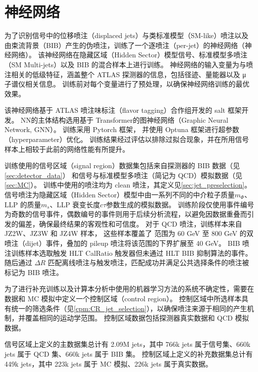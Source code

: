 
\chapter{神经网络}
\label{chap:NN}

为了识别信号中的位移喷注（displaced jets）与类标准模型（SM-like）喷注以及由束流背景（BIB）产生的伪喷注，训练了一个逐喷注（per-jet）的神经网络（神经网络）。
该神经网络在隐藏区域（Hidden Sector）模型信号、标准模型多喷注（SM Multi-jets）以及 BIB 的混合样本上进行训练。
神经网络的输入变量为与喷注相关的低级特征，涵盖整个 ATLAS 探测器的信息，包括径迹、量能器以及 μ 子谱仪相关信息。
训练前对每个变量进行了预处理，以确保神经网络训练的最优效果。

该神经网络基于 ATLAS 喷注味标注（flavor tagging）合作组开发的 salt 框架\cite{ATL-PHYS-PUB-2022-027}开发。
NN的主体结构选用基于 Transformer\cite{vaswani2023attentionneed}的图神经网络（Graphic Neural Network, GNN）。
训练采用 Pytorch 框架\cite{paszke2019pytorchimperativestylehighperformance}，
并使用 Optuna 框架\cite{akiba2019optunanextgenerationhyperparameteroptimization}进行超参数（hyperparameter）优化。
训练结果经过评估以排除过拟合现象，并在所用信号样本上相较于此前的网络性能有所提升。

训练使用的信号区域（signal region）数据集包括来自探测器的 BIB 数据（见\autoref{sec:detector_data}）
和信号与标准模型多喷注（简记为 QCD）模拟数据（见\autoref{sec:MC}）。
训练中使用的喷注均为 clean 喷注，其定义见\autoref{sec:jet_preselection}。
信号喷注为隐藏区域（Hidden Sector）模型中由一系列不同的中介粒子质量$m_\Phi$、LLP 的质量$m_s$、LLP 衰变长度$c\tau$参数生成的模拟数据。
训练阶段仅使用事件编号为奇数的信号事件，偶数编号的事件则用于后续分析流程，以避免因数据重叠而引发的偏差，确保最终结果的客观性和可信度。
对于 QCD 喷注，训练样本来自 JZ2W、JZ3W 和 JZ4W 样本，
这些样本覆盖了 \pt 范围为 60 GeV 至 800 GeV 的双喷注（dijet）事件，叠加的 pileup 喷注将该范围的下界扩展至 40 GeV。
BIB 喷注训练样本选取触发 HLT CalRatio 触发器但未通过 HLT BIB 抑制算法的事件。
随后通过 $\Delta R$ 匹配离线喷注与触发喷注，匹配成功并满足公共选择条件的喷注被标记为 BIB 喷注。

为了进行补充训练以及计算本分析中使用的机器学习方法的系统不确定性，需要在数据和 MC 模拟中定义一个控制区域（control region）。
控制区域中所选样本具有统一的筛选条件（见\autoref{cpm:CR_jet_selection}），以确保喷注来源于相同的产生机制，并覆盖相同的运动学范围。
控制区域数据包括探测器真实数据和 QCD 模拟数据。

信号区域上定义的主数据集总计有 2.09M jets，其中 766k jets 属于信号集、660k jets 属于 QCD 集、660k jets 属于 BIB 集。
控制区域上定义的补充数据集总计有 449k jets，其中 223k jets 属于 MC 模拟、226k jets 属于真实数据。

